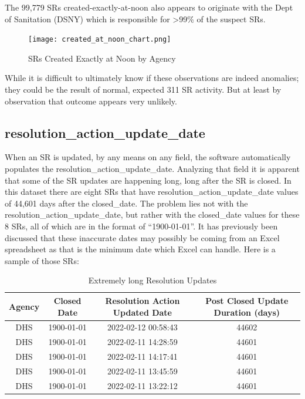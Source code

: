 \documentclass[12pt, titlepage]{article}
\begin{document}
{	The 99,779 SRs created-exactly-at-noon also appears to originate with the Dept of Sanitation (DSNY) which
	is responsible for \textgreater{}99\% of the suspect SRs.
	
	\begin{figure}[H]
		 \centering
		 \texttt{[image: created\_at\_noon\_chart.png]}
		 \caption{SRs Created Exactly at Noon by Agency}
		 \label{fig:noon-created}
	\end{figure}		
		
	While it is difficult to ultimately know if these observations are indeed anomalies; they could be the result of normal, expected
	311 SR activity. But at least by observation that outcome appears very unlikely.	
		
	\subsection{resolution\_action\_update\_date}
	When an SR is updated, by any means on any field, the software automatically populates the resolution\_action\_update\_date. Analyzing that field
	it is apparent that some of the SR updates are happening long, long after the SR is closed. In this dataset there are eight SRs that have 
	resolution\_action\_update\_date values of 44,601 days after the closed\_date. The problem lies not with the resolution\_action\_update\_date, but
	rather with the closed\_date values for these 8 SRs, all of which are in the format of ``1900-01-01''. It has previously been discussed that these
	inaccurate dates may possibly be coming from an Excel spreadsheet as that is the minimum date which Excel can handle. Here is a sample
	of those SRs:

	\begin{table}[H]
	    \centering
	    \footnotesize
	    \begin{tabular}{cccc}
	        \hline
	        Agency & Closed Date & Resolution Action Updated Date & Post Closed Update Duration (days) \\
	        \hline
	        DHS & 1900-01-01 & 2022-02-12 00:58:43 & 44602 \\
	        DHS & 1900-01-01 & 2022-02-11 14:28:59 & 44601 \\
	        DHS & 1900-01-01 & 2022-02-11 14:17:41 & 44601 \\
	        DHS & 1900-01-01 & 2022-02-11 13:45:59 & 44601 \\
	        DHS & 1900-01-01 & 2022-02-11 13:22:12 & 44601 \\
	        \hline
	    \end{tabular}
	    \caption{Extremely long Resolution Updates}
	    \label{tab:resolution-updates}
	\end{table}
	
}
\end{document}
